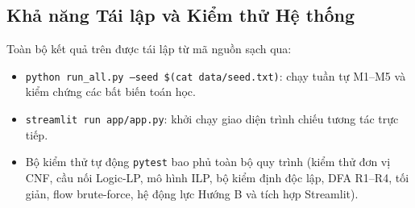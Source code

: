 \subsection{Khả năng Tái lập và Kiểm thử Hệ thống}
Toàn bộ kết quả trên được tái lập từ mã nguồn sạch qua:
\begin{itemize}
    \item \texttt{python run\_all.py --seed \$(cat data/seed.txt)}: chạy tuần tự M1--M5 và kiểm chứng các bất biến toán học.
    \item \texttt{streamlit run app/app.py}: khởi chạy giao diện trình chiếu tương tác trực tiếp.
    \item Bộ kiểm thử tự động \texttt{pytest} bao phủ toàn bộ quy trình (kiểm thử đơn vị CNF, cầu nối Logic-LP, mô hình ILP, bộ kiểm định độc lập, DFA R1--R4, tối giản, flow brute-force, hệ động lực Hướng B và tích hợp Streamlit).
\end{itemize}